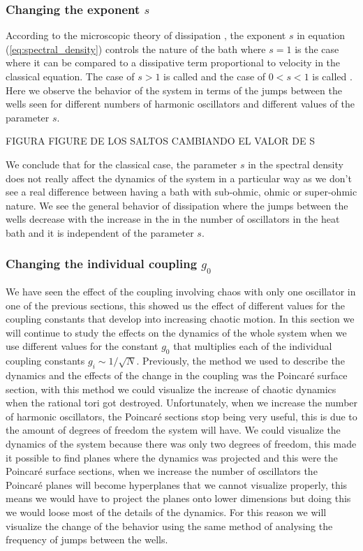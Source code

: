 \subsubsection{Changing the exponent $s$}
According to the microscopic theory of dissipation \cite{leggett1987dynamics}, the exponent $s$ in equation (\ref{eq:spectral_density}) controls the nature of the bath where $s=1$ is the  case where it can be compared to a dissipative term proportional to velocity in the classical equation. The case of $s>1$ is called  and the case of $0<s<1$ is called . Here we observe the behavior of the system in terms of the jumps between the wells seen for different numbers of harmonic oscillators and different values of the parameter $s$. \par

FIGURA FIGURE DE LOS SALTOS CAMBIANDO EL VALOR DE S\par 

We conclude that for the classical case, the parameter $s$ in the spectral density does not really affect the dynamics of the system in a particular way as we don't see a real difference between having a bath with sub-ohmic, ohmic or super-ohmic nature. We see the general behavior of dissipation where the jumps between the wells decrease with the increase in the in the number of oscillators in the heat bath and it is independent of the parameter $s$.

\subsubsection{Changing the individual coupling $g_0$}
We have seen the effect of the coupling involving chaos with only one oscillator in one of the previous sections, this showed us the effect of different values for the coupling constants that develop into increasing chaotic motion. In this section we will continue to study the effects on the dynamics of the whole system when we use different values for the constant $g_0$ that multiplies each of the individual coupling constants $g_i \sim 1/\sqrt{N}$. Previously, the method we used to describe the dynamics and the effects of the change in the coupling was the Poincaré surface section, with this method we could visualize the increase of chaotic dynamics when the rational tori got destroyed. Unfortunately, when we increase the number of harmonic oscillators, the Poincaré sections stop being very useful, this is due to the amount of degrees of freedom the system will have. We could visualize the dynamics of the system because there was only two degrees of freedom, this made it possible to find planes where the dynamics was projected and this were the Poincaré surface sections, when we increase the number of oscillators the Poincaré planes will become hyperplanes that we cannot visualize properly, this means we would have to project the planes onto lower dimensions but doing this we would loose most of the details of the dynamics. For this reason we will visualize the change of the behavior using the same method of analysing the frequency of jumps between the wells.\par 

